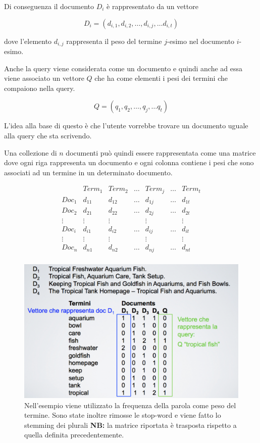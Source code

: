 Di conseguenza il documento $D_i$ è rappresentato da un vettore

$$
D_i = (d_{i,1},d_{i,2},\ldots,d_{i,j}, \ldots d_{i,t})
$$

\noindent dove l'elemento $d_{i,j}$ rappresenta il peso del termine $j$-esimo nel documento $i$-esimo.

Anche la query viene considerata come un documento e quindi anche ad essa viene associato un vettore $Q$ che ha come elementi i pesi dei termini che compaiono nella query.

$$
Q = (q_{1},q_{2},\ldots,q_{j}, \ldots q_{t})
$$

L'idea alla base di questo è che l'utente vorrebbe trovare un documento uguale alla query che sta scrivendo.

Una collezione di $n$ documenti può quindi essere rappresentata come una matrice dove ogni riga rappresenta un documento e ogni colonna contiene i pesi che sono associati ad un termine in un determinato documento.

$$
\begin{matrix}
& Term_1 & Term_2 & \ldots & Term_j & \ldots &Term_t \\ 
Doc_1 & d_{11} & d_{12}& \ldots & d_{1j} & \ldots & d_{1t} \\ 
Doc_2 & d_{21} & d_{22}& \ldots & d_{2j} & \ldots & d_{2t} \\ 
\vdots & \vdots &\vdots  &  & \vdots && \vdots\\ 
Doc_i & d_{i1} & d_{i2}& \ldots & d_{ij} & \ldots & d_{it} \\ 
\vdots & \vdots &\vdots  &  & \vdots && \vdots\\ 
Doc_n & d_{n1} & d_{n2}& \ldots & d_{nj} & \ldots & d_{nt} \\ 
\end{matrix}
$$

\begin{figure}[htbp]
	\centering
	\includegraphics[width=0.6\linewidth]{images/l8-mod-vet}
	\caption{Nell'esempio viene utilizzato la frequenza della parola come peso del termine. Sono state inoltre rimosse le stop-word e viene fatto lo stemming dei plurali \textbf{NB:} la matrice riportata è trasposta rispetto a quella definita precedentemente.}
\end{figure}

